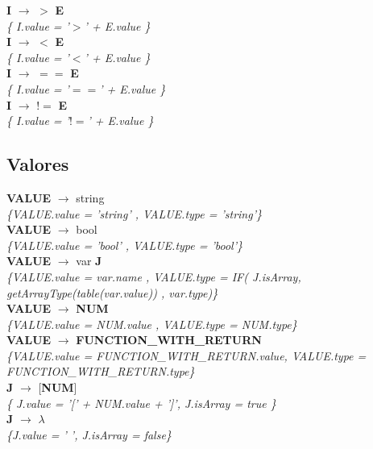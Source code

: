 \documentclass[10pt,a4paper]{article}
\begin{document}
\textbf{I} $\rightarrow$ $>$ \textbf{E} \\
\textit{\{ I.value = '$>$' + E.value  \}} \\

\textbf{I} $\rightarrow$ $<$ \textbf{E}\\
\textit{\{ I.value = '$<$' + E.value  \}} \\

\textbf{I} $\rightarrow$ $==$ \textbf{E}\\
\textit{\{ I.value =  '$==$' + E.value  \}} \\

\textbf{I} $\rightarrow$ $!=$ \textbf{E}\\
\textit{\{ I.value =  '$!=$' + E.value  \}} \\

\subsection{Valores}
\textbf{VALUE} $\rightarrow$ string \\
\textit{\{VALUE.value =  'string' , VALUE.type = 'string'\}} \\


\textbf{VALUE} $\rightarrow$ bool   \\
\textit{\{VALUE.value =  'bool' , VALUE.type = 'bool'\}} \\


\textbf{VALUE} $\rightarrow$ var \textbf{J} \\
\textit{\{VALUE.value =  var.name , VALUE.type = IF( J.isArray, getArrayType(table(var.value)) , var.type)\}} \\


\textbf{VALUE} $\rightarrow$ \textbf{NUM}   \\
\textit{\{VALUE.value =  NUM.value , VALUE.type =  NUM.type\}} \\


\textbf{VALUE} $\rightarrow$ \textbf{FUNCTION\_WITH\_RETURN} \\
\textit{\{VALUE.value =  FUNCTION\_WITH\_RETURN.value, VALUE.type = FUNCTION\_WITH\_RETURN.type\}} \\

\textbf{J} $\rightarrow$ [\textbf{NUM}] \\
\textit{\{ J.value = '[' + NUM.value + ']', J.isArray = true   \}} \\

\textbf{J} $\rightarrow$ $\lambda$   \\
\textit{\{J.value = ' ', J.isArray = false\}} \\
\end{document}
